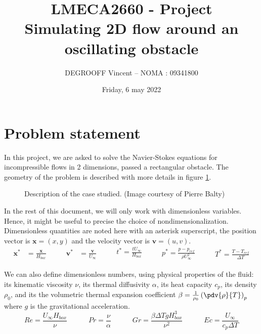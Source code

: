 \documentclass[11 pt]{article}
\title{LMECA2660 - Project\\ Simulating 2D flow around an oscillating obstacle}
\author{DEGROOFF Vincent \quad -- \quad NOMA : 09341800}
\date{Friday, 6 may 2022}
\begin{document}
\maketitle

\section{Problem statement}

In this project, we are asked to solve the Navier-Stokes equations for incompressible flows in 2 dimensions, passed a rectangular obstacle. The geometry of the problem is described with more details in figure \ref{fig:domain}.

\begin{figure}[h!tp]
\centering

\caption{Description of the case studied. (Image courtesy of Pierre Balty)}
\label{fig:domain}
\end{figure}

In the rest of this document, we will only work with dimensionless variables. Hence, it might be useful to precise the choice of nondimensionalization. Dimensionless quantities are noted here with an asterisk superscript, the position vector is $\mathbf{x} = (x,y)$ and the velocity vector is $\mathbf{v} = (u, v)$.
\begin{equation}
    \begin{split}
        \mathbf{x^*} &= \frac{\mathbf{x}}{H_{box}}
    \end{split}
    \qquad
    \begin{split}
        \mathbf{v^*} &= \frac{\mathbf{v}}{U_{\infty}}
    \end{split}
    \qquad
    \begin{split}
        t^* = \frac{t U_{\infty}}{H_{box}} \\
    \end{split}
    \qquad
    \begin{split}
        p^* = \frac{p-p_{ref}}{\rho U_{\infty}^2}
    \end{split}
    \qquad
    \begin{split}
        T^* = \frac{T - T_{ref}}{\Delta T}
    \end{split}
    \label{eq:adimChoice}
\end{equation}

We can also define dimensionless numbers, using physical properties of the fluid: its kinematic viscosity $\nu$, its thermal diffusivity $\alpha$, its heat capacity $c_p$, its density $\rho_0$, and its the volumetric thermal expansion coefficient $\beta=\frac{1}{\rho_0} \left(\pdv{\rho}{T}\right)_p$ where $g$ is the gravitational acceleration.
\begin{equation}
    Re = \frac{U_{\infty} H_{box}}{\nu} \qquad\quad
    Pr = \frac{\nu}{\alpha} \qquad\quad
    Gr = \frac{\beta \Delta T g H_{box}^3}{\nu^2} \qquad\quad
    Ec = \frac{U_{\infty}}{c_p \Delta T}
    \label{eq:adimNumbers}
\end{equation}
\end{document}
